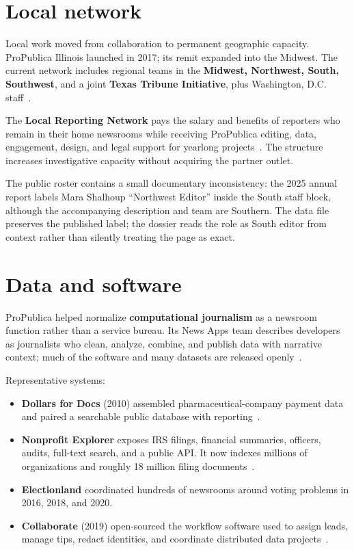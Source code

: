 \documentclass[10pt,letterpaper,twocolumn]{article}
\begin{document}
\section{Local network}

Local work moved from collaboration to permanent geographic capacity. ProPublica Illinois launched in 2017; its remit expanded into the Midwest. The current network includes regional teams in the \textbf{Midwest, Northwest, South, Southwest}, and a joint \textbf{Texas Tribune Initiative}, plus Washington, D.C. staff~\citep{pplocal,pp2025}.

The \textbf{Local Reporting Network} pays the salary and benefits of reporters who remain in their home newsrooms while receiving ProPublica editing, data, engagement, design, and legal support for yearlong projects~\citep{pppartners}. The structure increases investigative capacity without acquiring the partner outlet.

The public roster contains a small documentary inconsistency: the 2025 annual report labels Mara Shalhoup ``Northwest Editor'' inside the South staff block, although the accompanying description and team are Southern. The data file preserves the published label; the dossier reads the role as South editor from context rather than silently treating the page as exact.

\section{Data and software}

ProPublica helped normalize \textbf{computational journalism} as a newsroom function rather than a service bureau. Its News Apps team describes developers as journalists who clean, analyze, combine, and publish data with narrative context; much of the software and many datasets are released openly~\citep{ppnerds,ppnewsapps}.

Representative systems:

\begin{itemize}
\item \textbf{Dollars for Docs} (2010) assembled pharmaceutical-company payment data and paired a searchable public database with reporting~\citep{ppd4d}.
\item \textbf{Nonprofit Explorer} exposes IRS filings, financial summaries, officers, audits, full-text search, and a public API. It now indexes millions of organizations and roughly 18 million filing documents~\citep{ppnewsapps,pp990}.
\item \textbf{Electionland} coordinated hundreds of newsrooms around voting problems in 2016, 2018, and 2020.
\item \textbf{Collaborate} (2019) open-sourced the workflow software used to assign leads, manage tips, redact identities, and coordinate distributed data projects~\citep{ppcollaborate}.
\end{itemize}
\end{document}
